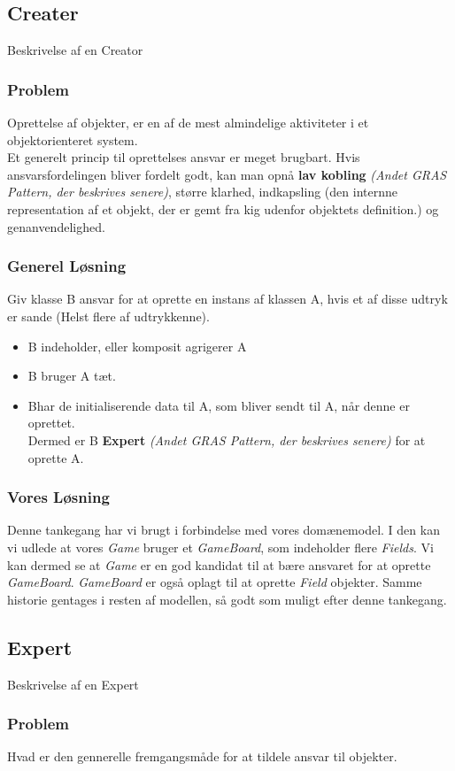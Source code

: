 \subsection{Creater}
Beskrivelse af en Creator
\subsubsection{Problem}
Oprettelse af objekter, er en af de mest almindelige aktiviteter i et objektorienteret system.
\\
Et generelt princip til oprettelses ansvar er meget brugbart. Hvis ansvarsfordelingen bliver fordelt godt, kan man opnå \textbf{lav kobling} \textit{(Andet GRAS Pattern, der beskrives senere)}, større klarhed, indkapsling (den internne representation af et objekt, der er gemt fra kig udenfor objektets definition.) og genanvendelighed.
\subsubsection{Generel Løsning}
Giv klasse B ansvar for at oprette en instans af klassen A, hvis et af disse udtryk er sande (Helst flere af udtrykkenne).
\begin{itemize}
\item B indeholder, eller komposit agrigerer A
\item B bruger A tæt.
\item Bhar de initialiserende data til A, som bliver sendt til A, når denne er oprettet.
\\
Dermed er B \textbf{Expert} \textit{(Andet GRAS Pattern, der beskrives senere)} for at oprette A.
\end{itemize}
\subsubsection{Vores Løsning}
Denne tankegang har vi brugt i forbindelse med vores domænemodel. I den kan vi udlede at vores \textit{Game} bruger et \textit{GameBoard}, som indeholder flere \textit{Fields}. Vi kan dermed se at \textit{Game} er en god kandidat til at bære ansvaret for at oprette \textit{GameBoard}. \textit{GameBoard} er også oplagt til at oprette \textit{Field} objekter. Samme historie gentages i resten af modellen, så godt som muligt efter denne tankegang.
\subsection{Expert}
Beskrivelse af en Expert
\subsubsection{Problem}
Hvad er den gennerelle fremgangsmåde for at tildele ansvar til objekter.
